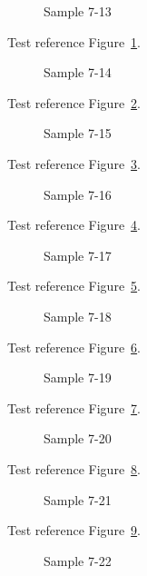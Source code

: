 \begin{figure}[tbhp]
\caption{Sample 7-13}
\label{fig:sample-7-13}
\end{figure}

Test reference Figure~\ref{fig:sample-7-13}.

\begin{figure}[tbhp]
\caption{Sample 7-14}
\label{fig:sample-7-14}
\end{figure}

Test reference Figure~\ref{fig:sample-7-14}.

\begin{figure}[tbhp]
\caption{Sample 7-15}
\label{fig:sample-7-15}
\end{figure}

Test reference Figure~\ref{fig:sample-7-15}.

\begin{figure}[tbhp]
\caption{Sample 7-16}
\label{fig:sample-7-16}
\end{figure}

Test reference Figure~\ref{fig:sample-7-16}.

\begin{figure}[tbhp]
\caption{Sample 7-17}
\label{fig:sample-7-17}
\end{figure}

Test reference Figure~\ref{fig:sample-7-17}.

\begin{figure}[tbhp]
\caption{Sample 7-18}
\label{fig:sample-7-18}
\end{figure}

Test reference Figure~\ref{fig:sample-7-18}.

\begin{figure}[tbhp]
\caption{Sample 7-19}
\label{fig:sample-7-19}
\end{figure}

Test reference Figure~\ref{fig:sample-7-19}.

\begin{figure}[tbhp]
\caption{Sample 7-20}
\label{fig:sample-7-20}
\end{figure}

Test reference Figure~\ref{fig:sample-7-20}.

\begin{figure}[tbhp]
\caption{Sample 7-21}
\label{fig:sample-7-21}
\end{figure}

Test reference Figure~\ref{fig:sample-7-21}.

\begin{figure}[tbhp]
\caption{Sample 7-22}
\label{fig:sample-7-22}
\end{figure}

